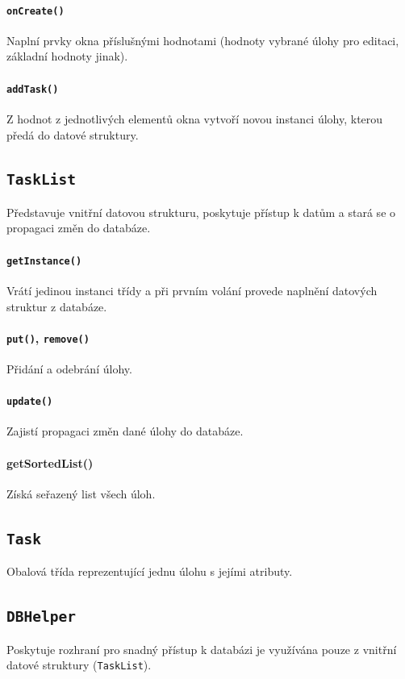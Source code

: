 \documentclass[12pt]{article}
\begin{document}
\paragraph{\texttt{onCreate()}}
Naplní prvky okna příslušnými hodnotami (hodnoty vybrané úlohy pro editaci, základní hodnoty jinak).

\paragraph{\texttt{addTask()}}
Z hodnot z jednotlivých elementů okna vytvoří novou instanci úlohy, kterou předá do datové struktury.

\subsection{\texttt{TaskList}}
Představuje vnitřní datovou strukturu, poskytuje přístup k datům a stará se o propagaci změn do databáze.

\paragraph{\texttt{getInstance()}}
Vrátí jedinou instanci třídy a při prvním volání provede naplnění datových struktur z databáze.

\paragraph{\texttt{put()}, \texttt{remove()}}
Přidání a odebrání úlohy.

\paragraph{\texttt{update()}}
Zajistí propagaci změn dané úlohy do databáze.

\paragraph{getSortedList()}
Získá seřazený list všech úloh.

\subsection{\texttt{Task}}
Obalová třída reprezentující jednu úlohu s jejími atributy.

\subsection{\texttt{DBHelper}}
Poskytuje rozhraní pro snadný přístup k databázi je využívána pouze z vnitřní datové struktury (\texttt{TaskList}).
\end{document}
